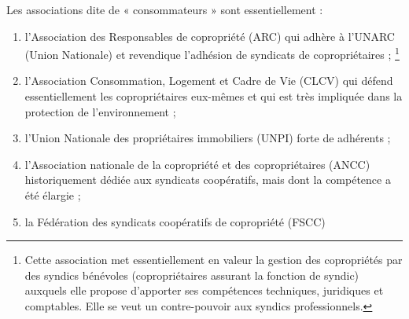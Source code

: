 	Les associations dite de « consommateurs » sont essentiellement :
	\begin{enumerate}
		\item l’Association des Responsables de copropriété (ARC) qui adhère à l’UNARC (Union Nationale) et revendique l’adhésion de  syndicats de copropriétaires ; \footnote{Cette association met essentiellement en valeur la gestion des copropriétés par des syndics bénévoles (copropriétaires assurant la fonction de syndic) auxquels elle propose d’apporter ses compétences techniques, juridiques et comptables. Elle se veut un contre-pouvoir aux syndics professionnels.}
		\item l’Association Consommation, Logement et Cadre de Vie (CLCV) qui défend essentiellement les copropriétaires eux-mêmes et qui est très impliquée dans la protection de l’environnement ;
		\item  l’Union Nationale des propriétaires immobiliers (UNPI) forte de  adhérents ;
		\item  l’Association nationale de la copropriété et des copropriétaires (ANCC) historiquement dédiée aux syndicats coopératifs, mais dont la compétence a été élargie ;
		\item  la Fédération des syndicats coopératifs de copropriété (FSCC)
	\end{enumerate}
